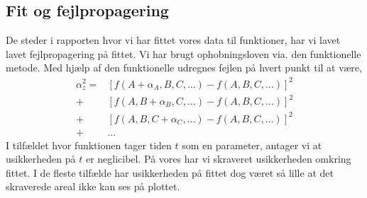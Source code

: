 \documentclass[working]{tuftebook}
\begin{document}
\subsection{Fit og fejlpropagering}
De steder i rapporten hvor vi har fittet vores data til funktioner, har vi lavet lavet fejlpropagering på fittet. Vi har brugt ophobningsloven via. den funktionelle metode. Med hjælp af den funktionelle udregnes fejlen på hvert punkt til at være,
\begin{align*}
	\alpha _z^2= &\left[ f\left( A + \alpha_A, B, C, \ldots \right) - f\left( A, B, C, \ldots\right)   \right]^2  \\
	 + &\left[ f\left( A, B + \alpha _B, C, \ldots  \right) - f\left( A, B, C, \ldots\right)   \right]^2 \\
	 + &\left[ f\left( A, B, C+\alpha_C , \ldots  \right) - f\left( A, B, C, \ldots\right)   \right]^2\\
	 + & \ldots
\end{align*}
I tilfældet hvor funktionen tager tiden $t$ som en parameter, antager vi at usikkerheden på $t$ er neglicibel. På vores har vi skraveret usikkerheden omkring fittet. I de fleste tilfælde har usikkerheden på fittet dog været så lille at det skraverede areal ikke kan ses på plottet.
\end{document}
